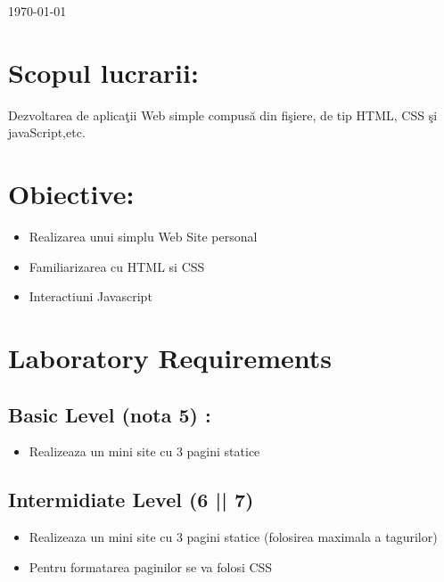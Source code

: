 \documentclass[12pt]{article}
\begin{document}
\begin{titlepage}

{\large \today}\\[2cm] %


\vfill %

\end{titlepage}
\section{Scopul lucrarii:}
Dezvoltarea de aplicaţii Web simple compusă din  fişiere, de tip HTML, CSS şi javaScript,etc.
\section{Obiective:}
\begin{itemize}
\item Realizarea unui simplu Web Site personal
\item Familiarizarea cu HTML si CSS
\item Interactiuni Javascript
\end{itemize}
\section{Laboratory Requirements}
\label{sec:examples}

\subsection{Basic Level (nota 5) :}
\begin{itemize}
\item Realizeaza un mini site cu 3 pagini statice
\end{itemize}


\subsection{Intermidiate Level (6 || 7)}
\begin{itemize}
\item Realizeaza un mini site cu 3 pagini statice (folosirea maximala a tagurilor)
\item Pentru formatarea paginilor se va folosi CSS
\end{itemize}
\end{document}
